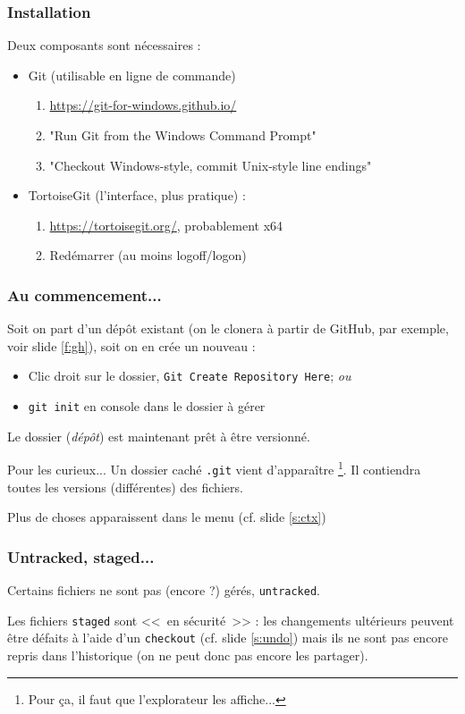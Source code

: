 \documentclass[compress]{beamer}
\newenvironment{curieux}
	{\begin{block}{Pour les curieux...}}
	{\end{block}}
\begin{document}
\begin{frame}
	\frametitle{Installation}
	Deux composants sont nécessaires :
	\begin{itemize}
		\item Git (utilisable en ligne de commande)
			\begin{enumerate}
				\item \url{https://git-for-windows.github.io/}
				\item "Run Git from the Windows Command Prompt" %
				\item "Checkout Windows-style, commit Unix-style line endings"
			\end{enumerate}
			\pause
		\item TortoiseGit (l'interface, plus pratique) :
			\begin{enumerate}
				\item \url{https://tortoisegit.org/}, probablement x64
				\item Redémarrer (au moins logoff/logon) %
			\end{enumerate}
	\end{itemize}
\end{frame}

\begin{frame}
	\frametitle{Au commencement...}
	Soit on part d'un dépôt existant (on le clonera à partir de GitHub,
	par exemple, voir slide \ref{f:gh}), soit on en crée un nouveau :
	\begin{itemize}
		\item Clic droit sur le dossier,
			\texttt{Git Create Repository Here}; \textit{ou}
		\item \texttt{git init} en console dans le dossier à gérer
	\end{itemize}

	Le dossier (\emph{dépôt}) est maintenant prêt à être versionné.
	\pause

	\begin{curieux}
		Un dossier caché \texttt{.git} vient d'apparaître
		\footnote{Pour ça, il faut que l'explorateur les affiche...}.
		Il contiendra toutes les versions (différentes) des fichiers.
	\end{curieux}
	\pause

	Plus de choses apparaissent dans le menu (cf. slide \ref{s:ctx})
\end{frame}

\begin{frame}
	\frametitle{Untracked, staged...}
	Certains fichiers ne sont pas (encore ?) gérés, \texttt{untracked}.

	Les fichiers \texttt{staged} sont <<~en sécurité~>> :
	les changements ultérieurs peuvent être défaits
	à l'aide d'un \texttt{checkout} (cf. slide \ref{s:undo})
	mais ils ne sont pas encore repris dans l'historique
	(on ne peut donc pas encore les partager).
\end{frame}
\end{document}

